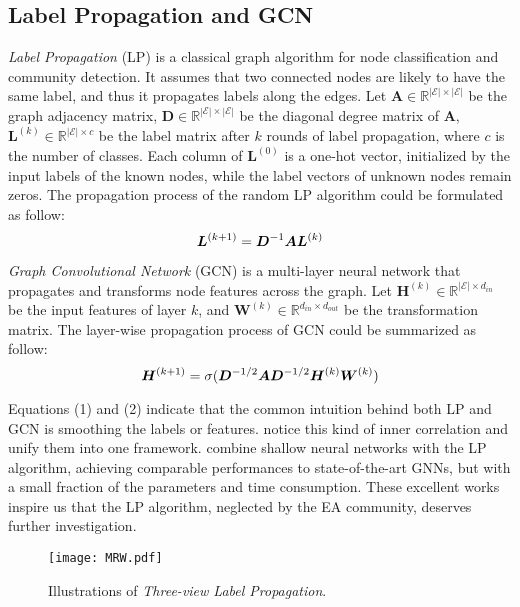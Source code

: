 \documentclass[11pt]{article}
\begin{document}
\subsection{Label Propagation and GCN}
\emph{Label Propagation} (LP) \cite{Zhu2002LearningFL} is a classical graph algorithm for node classification and community detection.
It assumes that two connected nodes are likely to have the same label, and thus it propagates labels along the edges.
Let $\bm A \in \mathbb{R}^{|\mathcal{E}|\times |\mathcal{E}|}$ be the graph adjacency matrix, $\bm D \in \mathbb{R}^{|\mathcal{E}|\times |\mathcal{E}|}$ be the diagonal degree matrix of $\bm A$, $\bm L^{(k)} \in \mathbb{R}^{|\mathcal{E}|\times c}$ be the label matrix after $k$ rounds of label propagation, where $c$ is the number of classes.
Each column of $\bm L^{(0)}$ is a one-hot vector, initialized by the input labels of the known nodes, while the label vectors of unknown nodes remain zeros.
The propagation process of the random LP algorithm could be formulated as follow:
\begin{equation}
    \bm L^{(k+1)}=\bm D^{-1}\bm A\bm L^{(k)}\\
\end{equation}

\emph{Graph Convolutional Network} (GCN) \cite{DBLP:journals/corr/KipfW16} is a multi-layer neural network that propagates and transforms node features across the graph.
Let $\bm H^{(k)} \in \mathbb{R}^{|\mathcal{E}|\times d_{in}}$ be the input features of layer $k$, and $\bm W^{(k)} \in\mathbb{R}^{d_{in}\times d_{out}}$ be the transformation matrix.
The layer-wise propagation process of GCN could be summarized as follow:
\begin{equation}
    \bm H^{(k+1)}=\sigma(\bm D^{-1/2}\bm A\bm D^{-1/2}\bm H^{(k)}\bm W^{(k)})\\
\end{equation}

Equations (1) and (2) indicate that the common intuition behind both LP and GCN is smoothing the labels or features.
\citet{DBLP:journals/corr/abs-2002-06755} notice this kind of inner correlation and unify them into one framework.
\citet{DBLP:conf/iclr/HuangHSLB21} combine shallow neural networks with the LP algorithm, achieving comparable performances to state-of-the-art GNNs, but with a small fraction of the parameters and time consumption.
These excellent works inspire us that the LP algorithm, neglected by the EA community, deserves further investigation.

\begin{figure*}
    \centering
    \texttt{[image: MRW.pdf]}
    \caption{Illustrations of \emph{Three-view Label Propagation}.}
    \label{fig:MRW}
\end{figure*}
\end{document}
